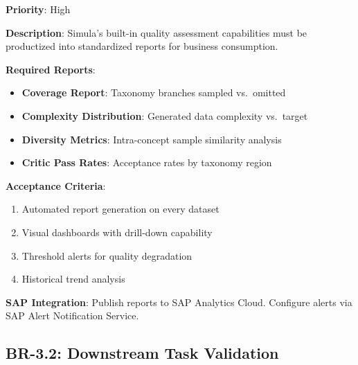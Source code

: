\begin{tcolorbox}[colback=yellow!5,colframe=yellow!70,title=BR-3.1: Standardized Quality Reporting]
\textbf{Priority}: High

\textbf{Description}: Simula's built-in quality assessment capabilities must be
productized into standardized reports for business consumption.

\textbf{Required Reports}:
\begin{itemize}
  \item \textbf{Coverage Report}: Taxonomy branches sampled vs.\ omitted
  \item \textbf{Complexity Distribution}: Generated data complexity vs.\ target
  \item \textbf{Diversity Metrics}: Intra-concept sample similarity analysis
  \item \textbf{Critic Pass Rates}: Acceptance rates by taxonomy region
\end{itemize}

\textbf{Acceptance Criteria}:
\begin{enumerate}
  \item Automated report generation on every dataset
  \item Visual dashboards with drill-down capability
  \item Threshold alerts for quality degradation
  \item Historical trend analysis
\end{enumerate}

\textbf{SAP Integration}: Publish reports to SAP Analytics Cloud. Configure
alerts via SAP Alert Notification Service.
\end{tcolorbox}

\subsection{BR-3.2: Downstream Task Validation}

